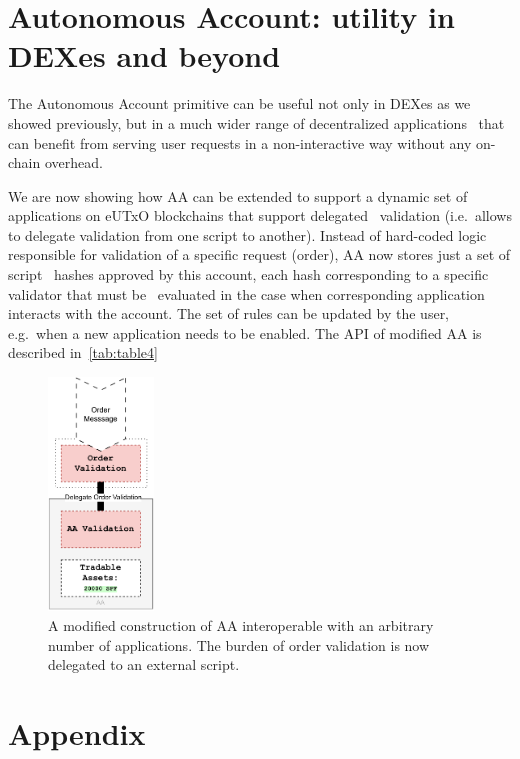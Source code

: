 \documentclass[11pt]{article}
\begin{document}
\begin{sloppypar}
        \newpage


        \section{Autonomous Account: utility in DEXes and beyond}\label{sec:autonomous-account}
        The Autonomous Account primitive can be useful not only in DEXes as we showed previously, but in a much wider range of decentralized applications \
        that can benefit from serving user requests in a non-interactive way without any on-chain overhead.

        We are now showing how AA can be extended to support a dynamic set of applications on eUTxO blockchains that support delegated \
        validation (i.e.\ allows to delegate validation from one script to another).
        Instead of hard-coded logic responsible for validation of a specific request (order), AA now stores just a set of script \
        hashes approved by this account, each hash corresponding to a specific validator that must be \
        evaluated in the case when corresponding application interacts with the account.
        The set of rules can be updated by the user, e.g.\ when a new application needs to be enabled.
        The API of modified AA is described in~\ref{tab:table4}

        \begin{figure}[h!]
            \centering
            \includegraphics[width=0.25\textwidth]{val_delegation}
            \caption{A modified construction of AA interoperable with an arbitrary number of applications.
            The burden of order validation is now delegated to an external script.}
            \label{fig:figure5}
        \end{figure}

        \newpage
        \appendix
        \section*{Appendix}\label{sec:appendix}


\end{sloppypar}
\end{document}
